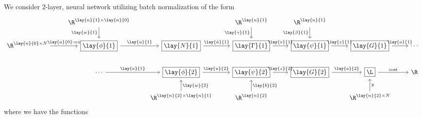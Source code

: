 We consider $2$-layer, neural network utilizing batch normalization of the form
{\tiny
\begin{equation*}
	\begin{tikzcd}
		{}
		&\R^{\lay{n}{1}\times\lay{n}{0}}
		\arrow[d, swap, "\lay{w}{1}"]
		&{}
		&\R^{\lay{n}{1}}
		\arrow[d, swap, "\lay{\gamma}{1}"]
		&\R^{\lay{n}{1}}
		\arrow[d, swap, "\lay{\beta}{1}"]
		&{}
		\\
		\R^{\lay{n}{0}\times N}
		\arrow[r, "\lay{a}{0}:=x"]
		&\boxed{\lay{\phi}{1}}
		\arrow[r, "\lay{u}{1}"]
		&\boxed{\lay{N}{1}}
		\arrow[r, "\lay{\hat{u}}{1}"]
		&\boxed{\lay{\Gamma}{1}}
		\arrow[r, "\lay{v}{1}"]
		&\boxed{\lay{\psi}{1}}
		\arrow[r, "\lay{z}{1}"]
		&\boxed{\lay{G}{1}}
		\arrow[r, "\lay{a}{1}"]
		&\cdots\\
		{}
		&\cdots
		\arrow[r, "\lay{a}{1}"]
		&\boxed{\lay{\phi}{2}}
		\arrow[r, "\lay{u}{2}"]
		&\boxed{\lay{\psi}{2}}
		\arrow[r, "\lay{z}{2}"]
		&\boxed{\lay{G}{2}}
		\arrow[r, "\lay{a}{2}"]
		&\boxed{\L}
		\arrow[r, "\text{cost}"]
		&\R
		\\
		{}
		&{}
		&\R^{\lay{n}{2}\times\lay{n}{1}}
		\arrow[u, swap, "\lay{w}{2}"]
		&\R^{\lay{n}{2}}
		\arrow[u, swap, "\lay{b}{2}"]
		&{}
		&\R^{\lay{n}{2}\times N}
		\arrow[u, swap, "y"]
		&{}
	\end{tikzcd}
\end{equation*}
}
where we have the functions
